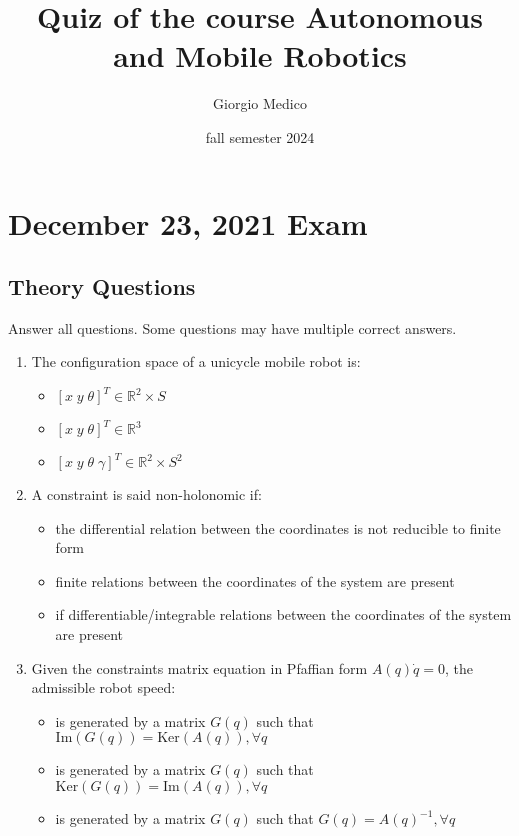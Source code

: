 \documentclass[openany]{book}
\title{Quiz of the course Autonomous and Mobile Robotics}
\author{Giorgio Medico}
\date{fall semester 2024}
\newcommand{\R}{\mathbb{R}}
\theoremstyle{definition}
\theoremstyle{remark}
\begin{document}
\maketitle

\chapter{December 23, 2021 Exam}

\section*{Theory Questions}
Answer all questions. Some questions may have multiple correct answers.

\begin{enumerate}
    \item The configuration space of a unicycle mobile robot is:
    \begin{itemize}
        \item[\checkmark] $[x\; y\; \theta]^T \in \R^2 \times S$
        \item[] $[x\; y\; \theta]^T \in \R^3$
        \item[] $[x\; y\; \theta\; \gamma]^T \in \R^2 \times S^2$
    \end{itemize}

    \item A constraint is said non-holonomic if:
    \begin{itemize}
        \item[\checkmark] the differential relation between the coordinates is not reducible to finite form
        \item[] finite relations between the coordinates of the system are present
        \item[] if differentiable/integrable relations between the coordinates of the system are present
    \end{itemize}

    \item Given the constraints matrix equation in Pfaffian form $A(q)\dot{q} = 0$, the admissible robot speed:
    \begin{itemize}
        \item[\checkmark] is generated by a matrix $G(q)$ such that $\text{Im}(G(q)) = \text{Ker}(A(q)), \forall q$
        \item[] is generated by a matrix $G(q)$ such that $\text{Ker}(G(q)) = \text{Im}(A(q)), \forall q$
        \item[] is generated by a matrix $G(q)$ such that $G(q) = A(q)^{-1}, \forall q$
    \end{itemize}


\end{enumerate}
\end{document}
